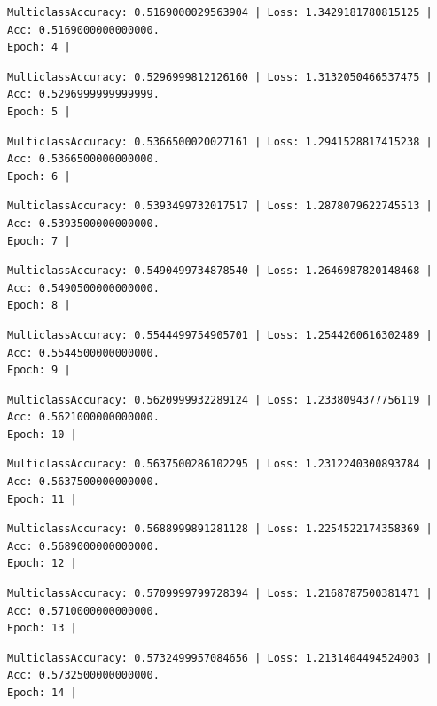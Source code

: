 \documentclass[
  letterpaper,
  DIV=11,
  numbers=noendperiod]{scrreprt}
\begin{document}
\begin{verbatim}
MulticlassAccuracy: 0.5169000029563904 | Loss: 1.3429181780815125 | Acc: 0.5169000000000000.
Epoch: 4 | 
\end{verbatim}

\begin{verbatim}
MulticlassAccuracy: 0.5296999812126160 | Loss: 1.3132050466537475 | Acc: 0.5296999999999999.
Epoch: 5 | 
\end{verbatim}

\begin{verbatim}
MulticlassAccuracy: 0.5366500020027161 | Loss: 1.2941528817415238 | Acc: 0.5366500000000000.
Epoch: 6 | 
\end{verbatim}

\begin{verbatim}
MulticlassAccuracy: 0.5393499732017517 | Loss: 1.2878079622745513 | Acc: 0.5393500000000000.
Epoch: 7 | 
\end{verbatim}

\begin{verbatim}
MulticlassAccuracy: 0.5490499734878540 | Loss: 1.2646987820148468 | Acc: 0.5490500000000000.
Epoch: 8 | 
\end{verbatim}

\begin{verbatim}
MulticlassAccuracy: 0.5544499754905701 | Loss: 1.2544260616302489 | Acc: 0.5544500000000000.
Epoch: 9 | 
\end{verbatim}

\begin{verbatim}
MulticlassAccuracy: 0.5620999932289124 | Loss: 1.2338094377756119 | Acc: 0.5621000000000000.
Epoch: 10 | 
\end{verbatim}

\begin{verbatim}
MulticlassAccuracy: 0.5637500286102295 | Loss: 1.2312240300893784 | Acc: 0.5637500000000000.
Epoch: 11 | 
\end{verbatim}

\begin{verbatim}
MulticlassAccuracy: 0.5688999891281128 | Loss: 1.2254522174358369 | Acc: 0.5689000000000000.
Epoch: 12 | 
\end{verbatim}

\begin{verbatim}
MulticlassAccuracy: 0.5709999799728394 | Loss: 1.2168787500381471 | Acc: 0.5710000000000000.
Epoch: 13 | 
\end{verbatim}

\begin{verbatim}
MulticlassAccuracy: 0.5732499957084656 | Loss: 1.2131404494524003 | Acc: 0.5732500000000000.
Epoch: 14 | 
\end{verbatim}
\end{document}
